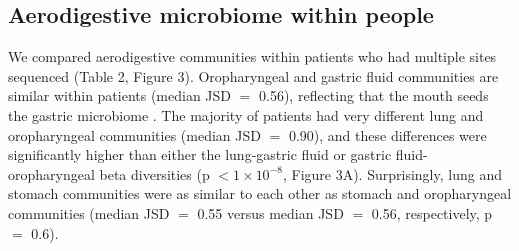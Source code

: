 



\subsection{Aerodigestive microbiome within people}

We compared aerodigestive communities within patients who had multiple sites sequenced (Table 2, Figure 3).
Oropharyngeal and gastric fluid communities are similar within patients (median JSD $=$ 0.56), reflecting that the mouth seeds the gastric microbiome \cite{Bassis2015source,Charlson2011topographical}.
The majority of patients had very different lung and oropharyngeal communities (median JSD $=$ 0.90), and these differences were significantly higher than either the lung-gastric fluid or gastric fluid-oropharyngeal beta diversities (p $< 1 \times 10^{-8}$, Figure 3A).
Surprisingly, lung and stomach communities were as similar to each other as stomach and oropharyngeal communities (median JSD $=$ 0.55 versus median JSD $=$ 0.56, respectively, p $=$ 0.6).

